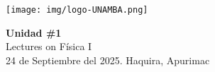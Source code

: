 

\begin{minipage}[l]{0.42\textwidth}
    \texttt{[image: img/logo-UNAMBA.png]}
\end{minipage}
\hfill
\begin{minipage}[c]{0.5\textwidth}
    \begin{flushright}
	\large{\textbf{Unidad \#1}}\\
	\large{Lectures on Física I}\\
	\large{24 de Septiembre del 2025. Haquira, Apurimac}\\
    \end{flushright}
\end{minipage}


  
